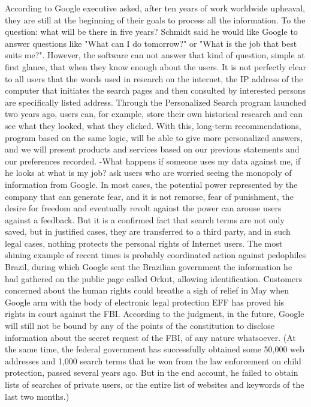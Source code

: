 According to Google executive asked, after ten years of work worldwide upheaval, they are still at the beginning of their goals to process all the information.
To the question: what will be there in five years? Schmidt said he would like Google to answer questions like "What can I do tomorrow?" or "What is the job that best suits me?". However, the software can not answer that kind of question, simple at first glance, that when they know enough about the users.
It is not perfectly clear to all users that the words used in research on the internet, the IP address of the computer that initiates the search pages and then consulted by interested persons are specifically listed address.
Through the Personalized Search program launched two years ago, users can, for example, store their own historical research and can see what they looked, what they clicked. With this, long-term recommendations, program based on the same logic, will be able to give more personalized answers, and we will present products and services based on our previous statements and our preferences recorded.
-What happens if someone uses my data against me, if he looks at what is my job? ask users who are worried seeing the monopoly of information from Google.
In most cases, the potential power represented by the company that can generate fear, and it is not remorse, fear of punishment, the desire for freedom and eventually revolt against the power can arouse users against a feedback.
But it is a confirmed fact that search terms are not only saved, but in justified cases, they are transferred to a third party, and in such legal cases, nothing protects the personal rights of Internet users.
The most shining example of recent times is probably coordinated action against pedophiles Brazil, during which Google sent the Brazilian government the information he had gathered on the public page called Orkut, allowing identification.
Customers concerned about the human rights could breathe a sigh of relief in May when Google arm with the body of electronic legal protection EFF has proved his rights in court against the FBI. According to the judgment, in the future, Google will still not be bound by any of the points of the constitution to disclose information about the secret request of the FBI, of any nature whatsoever.
(At the same time, the federal government has successfully obtained some 50,000 web addresses and 1,000 search terms that he won from the law enforcement on child protection, passed several years ago. But in the end account, he failed to obtain lists of searches of private users, or the entire list of websites and keywords of the last two months.)
